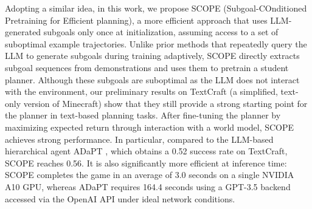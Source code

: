 Adopting a similar idea, in this work, we propose SCOPE (Subgoal-COnditioned Pretraining for Efficient planning), a more efficient approach that uses LLM-generated subgoals only once at initialization, assuming access to a set of suboptimal example trajectories. Unlike prior methods that repeatedly query the LLM to generate subgoals during training adaptively, SCOPE directly extracts subgoal sequences from demonstrations and uses them to pretrain a student planner. Although these subgoals are suboptimal as the LLM does not interact with the environment, our preliminary results on TextCraft (a simplified, text-only version of Minecraft) show that they still provide a strong starting point for the planner in text-based planning tasks. After fine-tuning the planner by maximizing expected return through interaction with a world model, SCOPE achieves strong performance. In particular, compared to the LLM-based hierarchical agent ADaPT \citep{PrasadKHCSBK2024}, which obtains a 0.52 success rate on TextCraft, SCOPE reaches 0.56. It is also significantly more efficient at inference time: SCOPE completes the game in an average of 3.0 seconds on a single NVIDIA A10 GPU, whereas ADaPT requires 164.4 seconds using a GPT-3.5 backend accessed via the OpenAI API under ideal network conditions.






